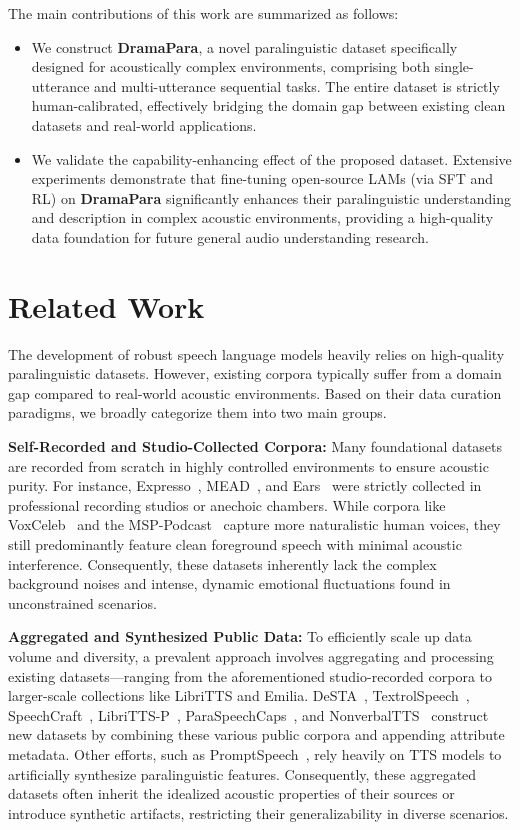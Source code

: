 \documentclass{Interspeech}
\begin{document}
The main contributions of this work are summarized as follows:
\begin{itemize}
    \item We construct \textbf{DramaPara}, a novel paralinguistic dataset specifically designed for acoustically complex environments, comprising both single-utterance and multi-utterance sequential tasks. The entire dataset is strictly human-calibrated, effectively bridging the domain gap between existing clean datasets and real-world applications.
    \item We validate the capability-enhancing effect of the proposed dataset. Extensive experiments demonstrate that fine-tuning open-source LAMs (via SFT and RL) on \textbf{DramaPara} significantly enhances their paralinguistic understanding and description in complex acoustic environments, providing a high-quality data foundation for future general audio understanding research.
\end{itemize}

\section{Related Work}
\label{sec:related}

The development of robust speech language models heavily relies on high-quality paralinguistic datasets. However, existing corpora typically suffer from a domain gap compared to real-world acoustic environments. Based on their data curation paradigms, we broadly categorize them into two main groups.

\textbf{Self-Recorded and Studio-Collected Corpora:} Many foundational datasets are recorded from scratch in highly controlled environments to ensure acoustic purity. For instance, Expresso~\cite{nguyen23_interspeech}, MEAD~\cite{MM_TTS}, and Ears~\cite{richter24_interspeech} were strictly collected in professional recording studios or anechoic chambers. While corpora like VoxCeleb~\cite{nagraniy2017voxceleb} and the MSP-Podcast~\cite{busso2025msp} capture more naturalistic human voices, they still predominantly feature clean foreground speech with minimal acoustic interference. Consequently, these datasets inherently lack the complex background noises and intense, dynamic emotional fluctuations found in unconstrained scenarios.

\textbf{Aggregated and Synthesized Public Data:} To efficiently scale up data volume and diversity, a prevalent approach involves aggregating and processing existing datasets—ranging from the aforementioned studio-recorded corpora to larger-scale collections like LibriTTS and Emilia. DeSTA~\cite{lu24c_interspeech}, TextrolSpeech~\cite{TextrolSpeech}, SpeechCraft~\cite{SpeechCraft}, LibriTTS-P~\cite{kawamura24_interspeech}, ParaSpeechCaps~\cite{diwan-etal-2025-scaling}, and NonverbalTTS~\cite{borisov25_ssw} construct new datasets by combining these various public corpora and appending attribute metadata. Other efforts, such as PromptSpeech~\cite{guo2023prompttts}, rely heavily on TTS models to artificially synthesize paralinguistic features. Consequently, these aggregated datasets often inherit the idealized acoustic properties of their sources or introduce synthetic artifacts, restricting their generalizability in diverse scenarios.
\end{document}
